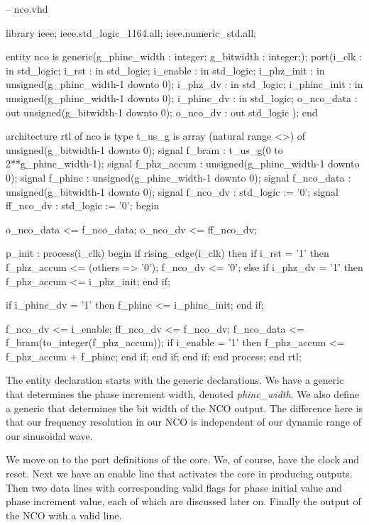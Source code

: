 \begin{VHDLlisting}[tabsize=2]
-- nco.vhd

library ieee;
	ieee.std_logic_1164.all;
	ieee.numeric_std.all;
	
entity nco is
generic(g_phinc_width : integer;
	    g_bitwidth    : integer;);
port(i_clk        : in    std_logic;
	 i_rst        : in    std_logic;
	 i_enable     : in    std_logic;
	 i_phz_init   : in    unsigned(g_phinc_width-1 downto 0);
	 i_phz_dv     : in    std_logic;
	 i_phinc_init : in    unsigned(g_phinc_width-1 downto 0);
	 i_phinc_dv   : in    std_logic;
	 o_nco_data   :   out unsigned(g_bitwidth-1 downto 0);
	 o_nco_dv     :   out std_logic
);
end 

architecture rtl of nco is
	type t_us_g is array (natural range <>) of unsigned(g_bitwidth-1 downto 0);
	signal f_bram       : t_us_g(0 to 2**g_phinc_width-1);
	signal f_phz_accum  : unsigned(g_phinc_width-1 downto 0);
	signal f_phinc      : unsigned(g_phinc_width-1 downto 0);
	signal f_nco_data   : unsigned(g_bitwidth-1 downto 0);
	signal f_nco_dv     : std_logic := '0';
	signal ff_nco_dv    : std_logic := '0';
begin

	o_nco_data <= f_nco_data;
	o_nco_dv   <= ff_nco_dv;
	
	p_init : process(i_clk)
	begin
		if rising_edge(i_clk) then
			if i_rst = '1' then
				f_phz_accum <= (others => '0');
				f_nco_dv <= '0';
			else
				if i_phz_dv = '1' then
					f_phz_accum <= i_phz_init;
				end if;
				
				if i_phinc_dv = '1' then
					f_phinc <= i_phinc_init;
				end if;
				
				f_nco_dv <= i_enable;
				ff_nco_dv <= f_nco_dv;
				f_nco_data <= f_bram(to_integer(f_phz_accum));
				if i_enable = '1' then
					f_phz_accum <= f_phz_accum + f_phinc;
				end if;				
			end if;
		end if;	
	end process;
end rtl;
\end{VHDLlisting}

The entity declaration starts with the generic declarations. We have a generic that determines the phase increment width, denoted \emph{phinc\_width}. We also define a generic that determines the bit width of the \ac{NCO} output. The difference here is that our frequency resolution in our \ac{NCO} is independent of our dynamic range of our sinusoidal wave. 

We move on to the port definitions of the core. We, of course, have the clock and reset. Next we have an enable line that activates the core in producing outputs. Then two data lines with corresponding valid flags for phase initial value and phase increment value, each of which are discussed later on. Finally the output of the \ac{NCO} with a valid line. 

